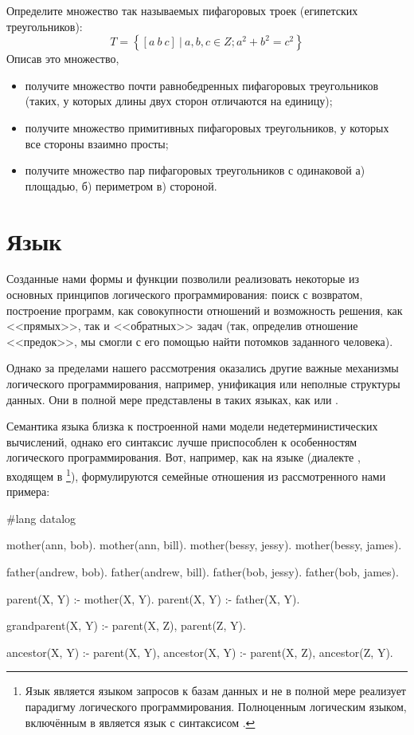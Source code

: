 \begin{Assignment}
Определите множество так называемых пифагоровых троек (египетских треугольников):
$$T = \left\{ [a~b~c]~|~a,b,c \in Z; a^2 + b^2 = c^2 \right\}$$
Описав это множество,
\begin{itemize}
  \item получите множество почти равнобедренных пифагоровых треугольников (таких, у которых длины двух сторон отличаются на единицу);
  \item получите множество примитивных пифагоровых треугольников, у которых все стороны взаимно просты;
  \item получите множество пар пифагоровых треугольников с одинаковой а) площадью, б) периметром в) стороной.
\end{itemize}
\end{Assignment}

\section[2]{Язык }%
Созданные нами формы и функции позволили реализовать некоторые из основных принципов логического программирования: поиск с возвратом, построение программ, как совокупности отношений и возможность решения, как <<прямых>>, так и <<обратных>> задач (так, определив отношение <<предок>>, мы смогли с его помощью найти потомков заданного человека). 

Однако за пределами нашего рассмотрения оказались другие важные механизмы логического программирования, например, унификация или неполные структуры данных. Они в полной мере представлены в таких языках, как  или .


Семантика языка  близка к построенной нами модели недетерминистических вычислений, однако его синтаксис лучше приспособлен к особенностям логического программирования. Вот, например, как на языке  (диалекте , входящем в \footnote{Язык  является языком запросов к базам данных и не в полной мере реализует парадигму логического программирования. Полноценным логическим языком, включённым в  является язык  с синтаксисом \Scheme.}), формулируются семейные отношения из рассмотренного нами примера:


\begin{Definition}
  #lang datalog

  mother(ann, bob).
  mother(ann, bill).
  mother(bessy, jessy).
  mother(bessy, james).

  father(andrew, bob).
  father(andrew, bill).
  father(bob, jessy).
  father(bob, james).

  parent(X, Y) :- mother(X, Y).
  parent(X, Y) :- father(X, Y).

  grandparent(X, Y) :- parent(X, Z), parent(Z, Y).

  ancestor(X, Y) :- parent(X, Y),
  ancestor(X, Y) :- parent(X, Z), ancestor(Z, Y).
\end{Definition}


